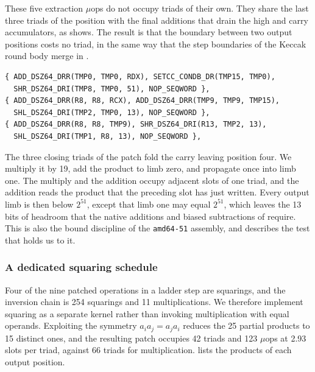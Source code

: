 These five extraction $\mu$ops do not occupy triads of their own.
They share the last three triads of the position with the final additions that
drain the high and carry accumulators, as  shows.
The result is that the boundary between two output positions costs no triad, in the
same way that the step boundaries of the Keccak round body merge in
.

\begin{lstlisting}[caption={The closing three triads of an output position. The
extraction shifts are interleaved with the additions that drain the high and carry
accumulators, and the output limb is written in slot~1 of the last triad. Slot~2 of
that triad reads the value that slot~0 has just written to \code{R8}, which relies
on the sequential slot semantics of a triad.},label={lst:c25519-extract}]
{ ADD_DSZ64_DRR(TMP0, TMP0, RDX), SETCC_CONDB_DR(TMP15, TMP0),
  SHR_DSZ64_DRI(TMP8, TMP0, 51), NOP_SEQWORD },
{ ADD_DSZ64_DRR(R8, R8, RCX), ADD_DSZ64_DRR(TMP9, TMP9, TMP15),
  SHL_DSZ64_DRI(TMP2, TMP0, 13), NOP_SEQWORD },
{ ADD_DSZ64_DRR(R8, R8, TMP9), SHR_DSZ64_DRI(R13, TMP2, 13),
  SHL_DSZ64_DRI(TMP1, R8, 13), NOP_SEQWORD },
\end{lstlisting}

The three closing triads of the patch fold the carry leaving position four.
We multiply it by 19, add the product to limb zero, and propagate once into limb
one.
The multiply and the addition occupy adjacent slots of one triad, and the addition
reads the product that the preceding slot has just written.
Every output limb is then below $2^{51}$, except that limb one may equal $2^{51}$,
which leaves the 13 bits of headroom that the native additions and biased
subtractions of  require.
This is also the bound discipline of the \texttt{amd64-51} assembly, and
 describes the test that holds us to it.

\subsubsection{A dedicated squaring schedule}
\label{sec:c25519-square}

Four of the nine patched operations in a ladder step are squarings, and the
inversion chain is 254 squarings and 11 multiplications.
We therefore implement squaring as a separate kernel rather than invoking
multiplication with equal operands.
Exploiting the symmetry $a_ia_j=a_ja_i$ reduces the 25 partial products to 15
distinct ones, and the resulting patch occupies 42 triads and 123 $\mu$ops at 2.93
slots per triad, against 66 triads for multiplication.
 lists the products of each output position.

